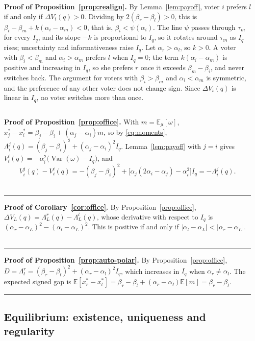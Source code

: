 \documentclass[12pt,letterpaper]{article}
\newenvironment{proof}[1][Proof]{\noindent\textbf{#1.} }{\ \rule{0.5em}{0.5em}}
\begin{document}
\begin{proof}[Proof of Proposition~\ref{prop:realign}]
By Lemma~\ref{lem:payoff}, voter $i$ prefers $l$ if and only if $\Delta V_i(q)>0$. Dividing by $2(\beta_r-\beta_l)>0$, this is $\beta_i-\beta_m+k(\alpha_i-\alpha_m)<0$, that is, $\beta_i<\psi(\alpha_i)$. The line $\psi$ passes through $\tau_m$ for every $I_q$, and its slope $-k$ is proportional to $I_q$, so it rotates around $\tau_m$ as $I_q$ rises; uncertainty and informativeness raise $I_q$. Let $\alpha_r>\alpha_l$, so $k>0$. A voter with $\beta_i<\beta_m$ and $\alpha_i>\alpha_m$ prefers $l$ when $I_q=0$; the term $k(\alpha_i-\alpha_m)$ is positive and increasing in $I_q$, so she prefers $r$ once it exceeds $\beta_m-\beta_i$, and never switches back. The argument for voters with $\beta_i>\beta_m$ and $\alpha_i<\alpha_m$ is symmetric, and the preference of any other voter does not change sign. Since $\Delta V_i(q)$ is linear in $I_q$, no voter switches more than once.
\end{proof}

\begin{proof}[Proof of Proposition~\ref{prop:office}]
With $m=\mathbb{E}_\mu[\omega]$, $x^*_j-x^*_i=\beta_j-\beta_i+(\alpha_j-\alpha_i)m$, so by \eqref{eq:moments}, $\Lambda_i^j(q)=(\beta_j-\beta_i)^2+(\alpha_j-\alpha_i)^2I_q$. Lemma~\ref{lem:payoff} with $j=i$ gives $V_i^i(q)=-\alpha_i^2\big(\operatorname{Var}(\omega)-I_q\big)$, and
\[
V_i^j(q)-V_i^i(q)=-(\beta_j-\beta_i)^2+\big[\alpha_j(2\alpha_i-\alpha_j)-\alpha_i^2\big]I_q=-\Lambda_i^j(q).
\]
\end{proof}

\begin{proof}[Proof of Corollary~\ref{cor:office}]
By Proposition~\ref{prop:office}, $\Delta V_L(q)=\Lambda_L^r(q)-\Lambda_L^l(q)$, whose derivative with respect to $I_q$ is $(\alpha_r-\alpha_L)^2-(\alpha_l-\alpha_L)^2$. This is positive if and only if $|\alpha_l-\alpha_L|<|\alpha_r-\alpha_L|$.
\end{proof}

\begin{proof}[Proof of Proposition~\ref{prop:auto-polar}]
By Proposition~\ref{prop:office}, $D=\Lambda_l^r=(\beta_r-\beta_l)^2+(\alpha_r-\alpha_l)^2I_q$, which increases in $I_q$ when $\alpha_r\ne\alpha_l$. The expected signed gap is $\mathbb{E}[x^*_r-x^*_l]=\beta_r-\beta_l+(\alpha_r-\alpha_l)\mathbb{E}[m]=\beta_r-\beta_l$.
\end{proof}

\subsection*{Equilibrium: existence, uniqueness and regularity}\label{app:small-h}
\end{document}
